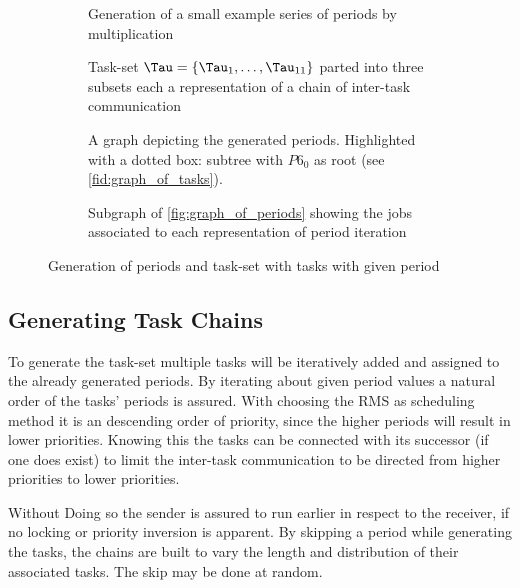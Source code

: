 \begin{figure}[ht]
	\begin{subfigure}[c]{0.45\textwidth}
		\resizebox{\textwidth}{!}{%
			\label{fig:chain_of_periods}
		
		}
		\caption{Generation of a small example series of periods by multiplication}
	\end{subfigure}
	\hfill
	\begin{subfigure}[c]{0.45\textwidth}
		\resizebox{\textwidth}{!}{%
			\label{fig:chain_of_tasks}
			
		}
		\caption{Task-set $\Tau=\{\Tau_{1}, \ldots, \Tau_{11}\}$ parted into three subsets each a representation of a chain of inter-task communication}
	\end{subfigure}
	\begin{subfigure}[c]{0.450\textwidth}
		\resizebox{\textwidth}{!}{%
			\label{fig:graph_of_periods}
			
		}
		\caption{A graph depicting the generated periods. Highlighted with a dotted box: subtree with $P6_0$ as root (see \cref{fid:graph_of_tasks}).}
	\end{subfigure}
	\hfill
	\begin{subfigure}[c]{0.45\textwidth}
		\resizebox{\textwidth}{!}{%
			\label{fig:graph_of_tasks}
			
		}
		\caption{Subgraph of \cref{fig:graph_of_periods} showing the jobs associated to each representation of period iteration}
	\end{subfigure}
	\caption{Generation of periods and task-set with tasks with given period}\label{fig:graph}
\end{figure}

\subsection{Generating Task Chains}\label{sec:concept_task_chains}
To generate the task-set multiple tasks will be iteratively added and assigned to the already generated periods.
By iterating about given period values a natural order of the tasks' periods is assured.
With choosing the \ac{RMS} as scheduling method it is an descending order of priority, since the higher periods will result in lower priorities.
Knowing this the tasks can be connected with its successor (if one does exist) to limit the inter-task communication to be directed from higher priorities to lower priorities.

Without \todo{!} 
Doing so the sender is assured to run earlier in respect to the receiver, if no locking or priority inversion is apparent. 
By skipping a period while generating the tasks, the chains are built to vary the length and distribution of their associated tasks.
The skip may be done at random.

